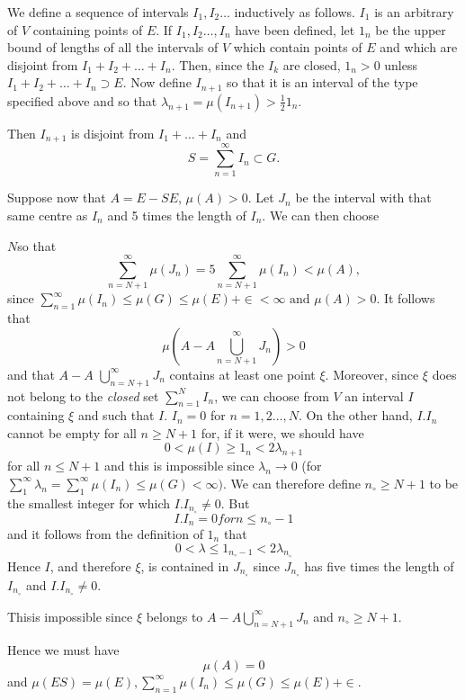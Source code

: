 We define a sequence of intervals $I_1 , I_2 \dots$ inductively as
follows. $I_1$ is an arbitrary of $V$ containing points of $E$. If $I_1
, I_2 \dots , I_n$ have been defined, let $1_n$ be the upper bound of
lengths of all the intervals of $V$ which contain points of $E$ and which
are disjoint from $I_1 + I_2 + \dots + I_n$. Then, since the $I_k$
are closed, $1_n > 0$ unless $ I_1 + I_2 + \dots + I_n \supset E$. Now
define $I_{n+1}$ so that it is an interval of the type specified above
and so that $\lambda _{n+1} = \mu (I_{n+1})> \frac{1}{2} 1_n$. 

Then $I_{n+1}$ is disjoint from $I_1 + \dots + I_n$ and
$$ 
S = \sum^{\infty}_{n=1} I_n \subset G. 
$$

Suppose now that $A = E - SE$, $\mu (A) > 0$. Let $J_n$ be the
interval with that same centre as $I_n$ and 5 times the length of
$I_n$. We can then choose 

$N$\pageoriginale so that
$$
\sum^{\infty}_{n=N+1} \mu (J_n) = 5
\sum^{\infty}_{n=N+1} \mu (I_n) < \mu (A),
$$ 
since $\sum\limits^{\infty}_{n=1} \mu (I_n) \leq \mu (G) \leq \mu (E) + \in <
\infty \text { and } \mu (A) > 0.$ 
It follows that
$$ 
\mu \left(A -A \bigcup^{\infty}_{n=N+1} J_n\right) > 0 
$$
and that $A-A$  $\bigcup\limits^{\infty}_{n=N+1} J_n$ contains at least one
point $\xi$. Moreover, since $\xi$ does not belong to the \textit{closed} set
$\sum\limits^{N}_{n=1} I_n$, we can choose from $V$ an
interval $I$ containing $\xi$ and such that $I$. $I_n =0$ for $n=1,2
\dots , N$. On the other hand, $I. I_n$ cannot be empty for all $n\geq
N+1$ for, if it were, we should have 
$$ 
0< \mu (I) \geq 1_n < 2 \lambda_{n+1}
$$
for all $n \leq N +1$ and this is impossible since $\lambda _n
\rightarrow 0$ (for $\sum\limits^{\infty}_{1} \lambda_n=
\sum\limits^{\infty}_{1} \mu (I_n) \leq \mu (G) < \infty)$.  We can therefore
define $n_\circ \geq N+1$ to be the 
smallest integer for which $I.I_{n_\circ} \neq 0$. But  
$$ 
I.I_n =0 for n \leq n_\circ -1
$$
and it follows from the definition of $1_n$ that
$$ 
0 < \lambda \le 1_{n_\circ -1} < 2 \lambda_{n_\circ}
$$
Hence $I$, and therefore $\xi$, is contained in $J_{n_\circ}$ since
$J_{n_\circ}$ has five times the length of $I_{n_\circ}$ and
$I.I_{n_\circ} \neq 0$. 

This\pageoriginale is impossible since $\xi$ belongs to $A - A
\bigcup\limits^{\infty}_{n= N+1} J_n$  and $n_\circ \ge N + 1$.
 
 Hence we must have
 $$ 
\mu (A) = 0
$$ 
and $\mu (ES) =\mu (E), \sum\limits^{\infty}_{n=1}\mu (I_n)
\le \mu (G) \le \mu (E) + \in.$ 
  
